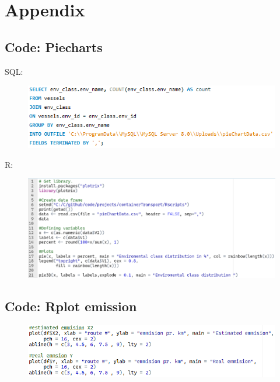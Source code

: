 \documentclass[a4paper]{article}
\begin{document}
\newpage
\section{Appendix}
\subsection{Code: Piecharts}
\label{appendix:pieChart}
SQL: 
\begin{figure} [H]
    \flushleft
    \includegraphics[width=1\linewidth]{code/pieSQL.PNG}
    \label{fig:Piechartss}
\end{figure} 
{\flushleft R:}
\begin{figure} [H]
    \flushleft
    \includegraphics[width=1\linewidth]{code/pieR.PNG}
    \label{fig:piechart}
\end{figure}

\subsection{Code: Rplot emission}
\label{appendix:emmisionRcode}
\begin{figure} [H]
    \flushleft
    \includegraphics[width=1\linewidth]{code/RemmisionPlot.PNG}
    \label{fig:RemmisionPlot}
\end{figure}

\newpage
\end{document}
